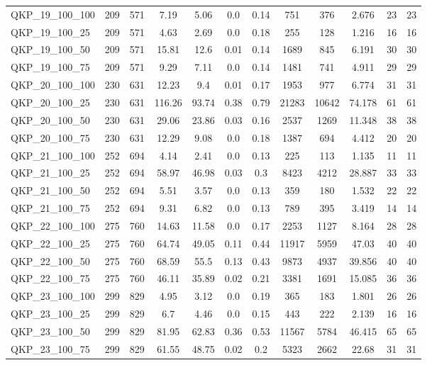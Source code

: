 \begin{table}[!h]
{\begin{tabular}{lccccccccccc}
QKP\_19\_100\_100 & 209 & 571 & 7.19 & 5.06 & 0.0 & 0.14 & 751 & 376 & 2.676 & 23 & 23\\
QKP\_19\_100\_25 & 209 & 571 & 4.63 & 2.69 & 0.0 & 0.18 & 255 & 128 & 1.216 & 16 & 16\\
QKP\_19\_100\_50 & 209 & 571 & 15.81 & 12.6 & 0.01 & 0.14 & 1689 & 845 & 6.191 & 30 & 30\\
QKP\_19\_100\_75 & 209 & 571 & 9.29 & 7.11 & 0.0 & 0.14 & 1481 & 741 & 4.911 & 29 & 29\\
QKP\_20\_100\_100 & 230 & 631 & 12.23 & 9.4 & 0.01 & 0.17 & 1953 & 977 & 6.774 & 31 & 31\\
QKP\_20\_100\_25 & 230 & 631 & 116.26 & 93.74 & 0.38 & 0.79 & 21283 & 10642 & 74.178 & 61 & 61\\
QKP\_20\_100\_50 & 230 & 631 & 29.06 & 23.86 & 0.03 & 0.16 & 2537 & 1269 & 11.348 & 38 & 38\\
QKP\_20\_100\_75 & 230 & 631 & 12.29 & 9.08 & 0.0 & 0.18 & 1387 & 694 & 4.412 & 20 & 20\\
QKP\_21\_100\_100 & 252 & 694 & 4.14 & 2.41 & 0.0 & 0.13 & 225 & 113 & 1.135 & 11 & 11\\
QKP\_21\_100\_25 & 252 & 694 & 58.97 & 46.98 & 0.03 & 0.3 & 8423 & 4212 & 28.887 & 33 & 33\\
QKP\_21\_100\_50 & 252 & 694 & 5.51 & 3.57 & 0.0 & 0.13 & 359 & 180 & 1.532 & 22 & 22\\
QKP\_21\_100\_75 & 252 & 694 & 9.31 & 6.82 & 0.0 & 0.13 & 789 & 395 & 3.419 & 14 & 14\\
QKP\_22\_100\_100 & 275 & 760 & 14.63 & 11.58 & 0.0 & 0.17 & 2253 & 1127 & 8.164 & 28 & 28\\
QKP\_22\_100\_25 & 275 & 760 & 64.74 & 49.05 & 0.11 & 0.44 & 11917 & 5959 & 47.03 & 40 & 40\\
QKP\_22\_100\_50 & 275 & 760 & 68.59 & 55.5 & 0.13 & 0.43 & 9873 & 4937 & 39.856 & 40 & 40\\
QKP\_22\_100\_75 & 275 & 760 & 46.11 & 35.89 & 0.02 & 0.21 & 3381 & 1691 & 15.085 & 36 & 36\\
QKP\_23\_100\_100 & 299 & 829 & 4.95 & 3.12 & 0.0 & 0.19 & 365 & 183 & 1.801 & 26 & 26\\
QKP\_23\_100\_25 & 299 & 829 & 6.7 & 4.46 & 0.0 & 0.15 & 443 & 222 & 2.139 & 16 & 16\\
QKP\_23\_100\_50 & 299 & 829 & 81.95 & 62.83 & 0.36 & 0.53 & 11567 & 5784 & 46.415 & 65 & 65\\
QKP\_23\_100\_75 & 299 & 829 & 61.55 & 48.75 & 0.02 & 0.2 & 5323 & 2662 & 22.68 & 31 & 31\\

\end{tabular}}
\end{table}

